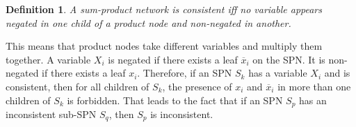 \documentclass[a4paper,10pt]{article}
\theoremstyle{plain}
\newtheorem*{spn-def}{Definition}
\begin{document}
\begin{figure}[h]
\end{figure}

\begin{spn-def}
  A sum-product network is consistent iff no variable appears negated in one child of a product
  node and non-negated in another.
\end{spn-def}

This means that product nodes take different variables and multiply them together. A variable $X_i$
is negated if there exists a leaf $\overline{x}_i$ on the SPN\@. It is non-negated if there exists
a leaf $x_i$. Therefore, if an SPN $S_k$ has a variable $X_i$ and is consistent, then for all
children of $S_k$, the presence of $x_i$ and $\overline{x}_i$ in more than one children of $S_k$ is
forbidden. That leads to the fact that if an SPN $S_p$ has an inconsistent sub-SPN $S_q$, then
$S_p$ is inconsistent.

\begin{figure}[h]
\end{figure}
\end{document}
